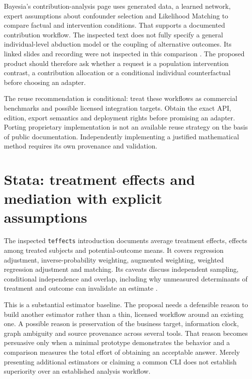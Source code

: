Bayesia's contribution-analysis page uses generated data, a learned network,
expert assumptions about confounder selection and Likelihood Matching to compare
factual and intervention conditions. That supports a documented contribution
workflow. The inspected text does not fully specify a general individual-level
abduction model or the coupling of alternative outcomes. Its linked slides
and recording were not inspected in this comparison
\citep{exec13_ci_bayesia_counterfactual}. The proposed product should therefore
ask whether a request is a population intervention contrast, a contribution
allocation or a conditional individual counterfactual before choosing an adapter.

The reuse recommendation is conditional: treat these workflows as commercial
benchmarks and possible licensed integration targets. Obtain the exact API,
edition, export semantics and deployment rights before promising an adapter.
Porting proprietary implementation is not an available reuse strategy on the
basis of public documentation. Independently implementing a justified
mathematical method requires its own provenance and validation.

\section{Stata: treatment effects and mediation with explicit assumptions}

The inspected \texttt{teffects} introduction documents average treatment effects,
effects among treated subjects and potential-outcome means. It covers regression
adjustment, inverse-probability weighting, augmented weighting, weighted
regression adjustment and matching. Its caveats discuss independent sampling,
conditional independence and overlap, including why unmeasured determinants of
treatment and outcome can invalidate an estimate
\citep{exec13_ci_stata_causal_intro}.

This is a substantial estimator baseline. The proposal needs a defensible reason
to build another estimator rather than a thin, licensed workflow around an
existing one. A possible reason is preservation of the business target,
information clock, graph ambiguity and source provenance across several tools.
That reason becomes persuasive only when a minimal prototype demonstrates the
behavior and a comparison measures the total effort of obtaining an acceptable
answer. Merely presenting additional estimators or claiming a common CLI does
not establish superiority over an established analysis workflow.

